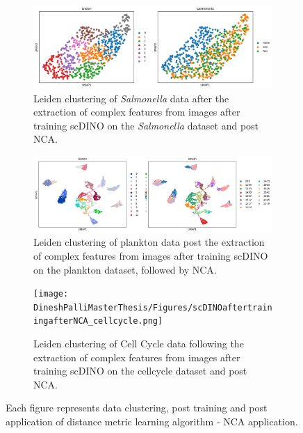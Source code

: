 \documentclass[12pt,a4paper]{article}
\begin{document}
\begin{figure}
  \centering
  \begin{subfigure}{\linewidth}
    \includegraphics[width=\linewidth]{Figures/scDINOaftertrainingafterNCA_salmonella.png}
    \caption{Leiden clustering of \textit{Salmonella} data after the extraction of complex features from images after training scDINO on the \textit{Salmonella} dataset and post NCA.}
    \label{multifig6:image_a}
  \end{subfigure}
  \hfill
  \begin{subfigure}{\linewidth}
    \includegraphics[width=\linewidth]{Figures/scDINOaftertrainingafterNCA_plankton.png}
    \caption{Leiden clustering of plankton data post the extraction of complex features from images after training scDINO on the plankton dataset, followed by NCA.}
    \label{multifig6:image_b}
  \end{subfigure}
  \hfill
  \begin{subfigure}{0.3\linewidth}
    \texttt{[image: DineshPalliMasterThesis/Figures/scDINOaftertrainingafterNCA\_cellcycle.png]}
    \caption{Leiden clustering of Cell Cycle data following the extraction of complex features from images after training scDINO on the cellcycle dataset and post NCA.}
    \label{multifig6:image_c}
  \end{subfigure}
  \caption{Each figure represents data clustering, post training and post application of distance metric learning algorithm - NCA application.}
  \label{multifig6:ClustersaftertrainingscDINO}
\end{figure}
\end{document}
